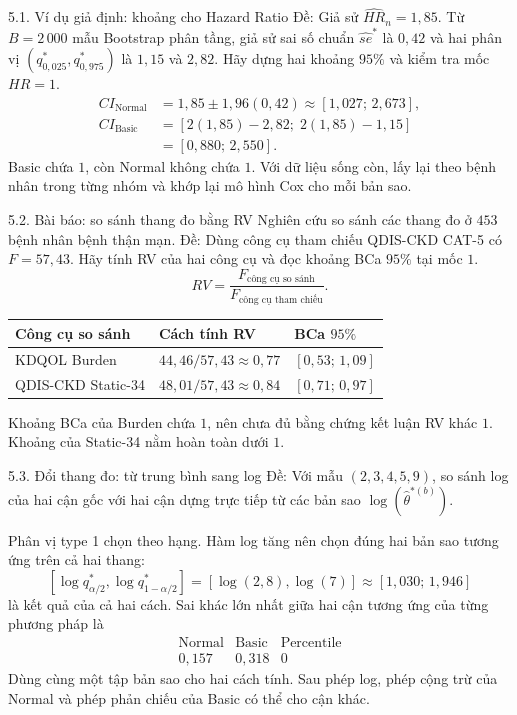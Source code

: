 \documentclass[aspectratio=43,10pt]{beamer}
\begin{document}
\begin{frame}{5.1. Ví dụ giả định: khoảng cho Hazard Ratio}
    Đề: Giả sử $\widehat{HR}_n=1{,}85$. Từ $B=2\,000$ mẫu Bootstrap phân tầng, giả sử sai số chuẩn $\widehat{se}^*$ là $0{,}42$ và hai phân vị $(q_{0{,}025}^*,q_{0{,}975}^*)$ là $1{,}15$ và $2{,}82$. Hãy dựng hai khoảng $95\%$ và kiểm tra mốc $HR=1$.
    \[
    \begin{aligned}
    CI_{\text{Normal}}
     &=1{,}85\pm1{,}96(0{,}42)\approx[1{,}027;\,2{,}673],\\
    CI_{\text{Basic}}
     &=[2(1{,}85)-2{,}82;\;2(1{,}85)-1{,}15]\\
     &=[0{,}880;\,2{,}550].
    \end{aligned}
    \]
    Basic chứa $1$, còn Normal không chứa $1$. Với dữ liệu sống còn, lấy lại theo bệnh nhân trong từng nhóm và khớp lại mô hình Cox cho mỗi bản sao.
\end{frame}

\begin{frame}{5.2. Bài báo: so sánh thang đo bằng RV}
    \small
    Nghiên cứu so sánh các thang đo ở $453$ bệnh nhân bệnh thận mạn. Đề: Dùng công cụ tham chiếu QDIS-CKD CAT-5 có $F=57{,}43$. Hãy tính RV của hai công cụ và đọc khoảng BCa $95\%$ tại mốc $1$.
    \[
    RV=\frac{F_{\text{công cụ so sánh}}}{F_{\text{công cụ tham chiếu}}}.
    \]
    \centering
    \begin{tabular}{lll}
    \toprule Công cụ so sánh & Cách tính RV & BCa $95\%$\\ \midrule
    KDQOL Burden & $44{,}46/57{,}43\approx0{,}77$ & $[0{,}53;\,1{,}09]$\\
    QDIS-CKD Static-34 & $48{,}01/57{,}43\approx0{,}84$ & $[0{,}71;\,0{,}97]$\\
    \bottomrule
    \end{tabular}\par
    \raggedright\medskip
    Khoảng BCa của Burden chứa $1$, nên chưa đủ bằng chứng kết luận RV khác $1$. Khoảng của Static-34 nằm hoàn toàn dưới $1$.
\end{frame}

\begin{frame}{5.3. Đổi thang đo: từ trung bình sang log}
    \small
    Đề: Với mẫu $(2,3,4,5,9)$, so sánh log của hai cận gốc với hai cận dựng trực tiếp từ các bản sao $\log(\hat\theta^{*(b)})$.
    \medskip

    Phân vị type 1 chọn theo hạng. Hàm log tăng nên chọn đúng hai bản sao tương ứng trên cả hai thang:
    \[
    [\log q_{\alpha/2}^*,\log q_{1-\alpha/2}^*]=[\log(2{,}8),\log(7)]
    \approx[1{,}030;\,1{,}946]
    \]
    là kết quả của cả hai cách. Sai khác lớn nhất giữa hai cận tương ứng của từng phương pháp là
    \[
    \begin{array}{ccc}
    \text{Normal} & \text{Basic} & \text{Percentile}\\
    0{,}157 & 0{,}318 & 0
    \end{array}
    \]
    Dùng cùng một tập bản sao cho hai cách tính. Sau phép log, phép cộng trừ của Normal và phép phản chiếu của Basic có thể cho cận khác.
\end{frame}
\end{document}
